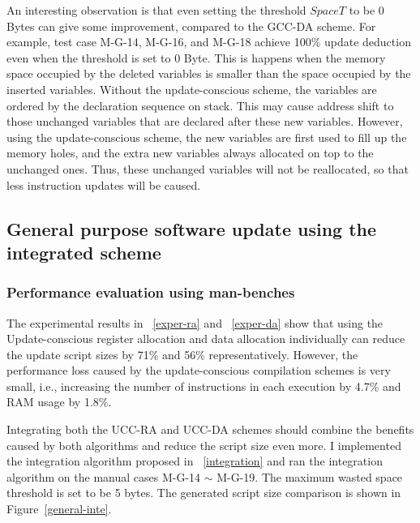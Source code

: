 An interesting observation is that even setting the threshold $SpaceT$ to be 0 Bytes can 
give some improvement, compared to the GCC-DA scheme. 
For example, test case M-G-14, M-G-16, and M-G-18 achieve 100\% update deduction
even when the threshold is set to 0 Byte.
This is happens when the memory space occupied by the deleted variables is smaller
than the space occupied by the inserted variables. 
Without the update-conscious scheme, the variables are ordered by the declaration 
sequence on stack. This may cause address shift to those unchanged variables
that are declared after these new variables. However, using the update-conscious scheme,
the new variables are first used to fill up the memory holes, and the extra new variables always 
allocated on top to the unchanged ones. Thus, these
unchanged variables will not be reallocated, so that less instruction updates will be
caused.

\subsection{General purpose software update using the integrated scheme}

\subsubsection{Performance evaluation using man-benches}
The experimental results in ~\ref{exper-ra} and ~\ref{exper-da} show that
using the Update-conscious register allocation and data allocation individually
can reduce the update script sizes by 71\% and 56\% representatively.
However, the performance loss caused by the update-conscious compilation schemes 
is very small, i.e., increasing the number of instructions in each execution by 
4.7\% and RAM usage by 1.8\%.

Integrating both the UCC-RA and UCC-DA schemes should combine the benefits
caused by both algorithms and reduce the script size even more.
I implemented the integration algorithm proposed in ~\ref{integration} and
ran the integration algorithm on the manual cases M-G-14 $\sim$ M-G-19.
The maximum wasted space threshold is set to be 5 bytes. The generated 
script size comparison is shown in Figure~\ref{general-inte}.

